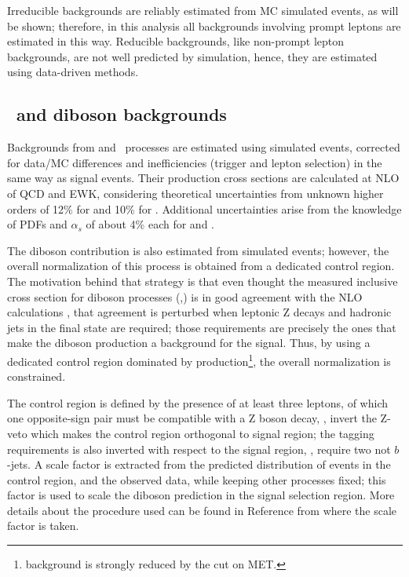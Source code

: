 Irreducible backgrounds are reliably estimated from MC simulated events, as will be shown; therefore, in this analysis all backgrounds involving prompt leptons are estimated in this way. Reducible backgrounds, like non-prompt lepton backgrounds, are not well predicted by simulation, hence, they are estimated using data-driven methods.

\subsection{\ttV\ and diboson backgrounds}

Backgrounds from \ttW and \ttZ\ processes are estimated using simulated events, corrected for data/MC differences and inefficiencies (trigger and lepton selection) in the same way as signal events. Their production cross sections are calculated at NLO of QCD and EWK, considering theoretical uncertainties from unknown higher orders of 12\% for \ttW and 10\% for \ttZ. Additional uncertainties arise from the knowledge of PDFs and $\alpha_s$ of about 4\% each for \ttW and \ttZ.

The diboson contribution is also estimated from simulated events; however, the overall normalization of this process is obtained from a dedicated control region. The motivation behind that strategy is that even thought the measured inclusive cross section for diboson processes (\WZ,\ZZ) is in good agreement with the NLO calculations \cite{CMS_AN_2017-029}, that agreement is perturbed when leptonic Z decays and hadronic jets in the final state are required; those requirements are precisely the ones that make the diboson production a background for the \tHq signal. Thus, by using a dedicated control region dominated by \WZ production\footnote{\ZZ background is strongly reduced by the cut on MET.}, the overall normalization is constrained.

The control region is defined by the presence of at least three leptons, of which one opposite-sign pair must be compatible with a Z boson decay, \ie, invert the Z-veto which makes the control region orthogonal to signal region; the \bjet tagging requirements is also inverted with respect to the signal region, \ie, require two not $b$-jets. A scale factor is extracted from the predicted distribution of \WZ events in the control region, and the observed data, while keeping other processes fixed; this factor is used to scale the diboson prediction in the signal selection region. More details about the procedure used can be found in Reference \cite{CMS_AN_2017-029} from where the scale factor is taken.

